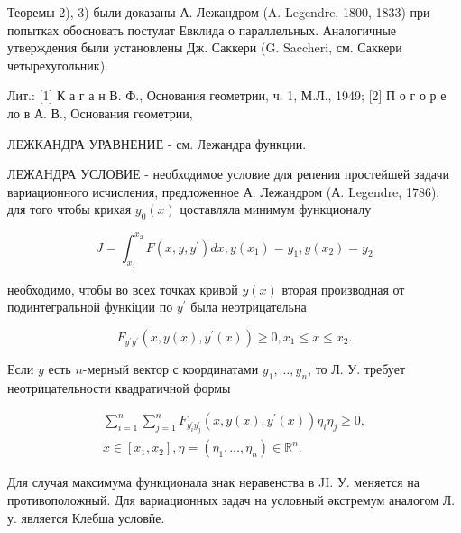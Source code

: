 \documentclass[10pt]{article}
\begin{document}
Теоремы 2), 3) были доказаны А. Лежандром (A. Legendre, 1800, 1833) при попытках обосновать постулат Евклида о параллельных. Аналогичные утверждения были установлены Дж. Саккери (G. Saccheri, см. Саккери четырехугольник).



Лит.: [1] К а г а н В. Ф., Основания геометрии, ч. 1, М.Л., 1949; [2] П о г о р е ло в А. В., Основания геометрии,



ЛЕЖКАНДРА УРАВНЕНИЕ - см. Лежандра функции.



ЛЕЖАНДРА УСЛОВИЕ - необходимое условие для репения простейшей задачи вариационного исчисления, предложенное А. Лежандром (А. Legendre, 1786): для того чтобы крихая $y_{0}(x)$ цоставляла минимум функционалу



\[

J=\int_{x_{1}}^{x_{2}} F\left(x, y, y^{\prime}\right) d x, y\left(x_{1}\right)=y_{1}, y\left(x_{2}\right)=y_{2}

\]



необходимо, чтобы во всех точках кривой $y(x)$ вторая производная от подинтегральной функіции по $y^{\prime}$ была неотрицательна



\[

F_{y^{\prime} y^{\prime}}\left(x, y(x), y^{\prime}(x)\right) \geqslant 0, x_{1} \leqslant x \leqslant x_{2} .

\]



Если $y$ есть $n$-мерный вектор с координатами $y_{1}, \ldots, y_{n}$, то Л. У. требует неотрицательности квадратичной формы



\[

\begin{gathered}

\sum_{i=1}^{n} \sum_{j=1}^{n} F_{y_{i}^{\prime} y_{j}^{\prime}}\left(x, y(x), y^{\prime}(x)\right) \eta_{i} \eta_{j} \geqslant 0, \\

x \in\left[x_{1}, x_{2}\right], \eta=\left(\eta_{1}, \ldots, \eta_{n}\right) \in \mathbb{R}^{n} .

\end{gathered}

\]



Для случая максимума функционала знак неравенства в JI. У. меняется на противоположный. Для вариационных задач на условный әкстремум аналогом Л. у. является Клебша условӥе.
\end{document}
